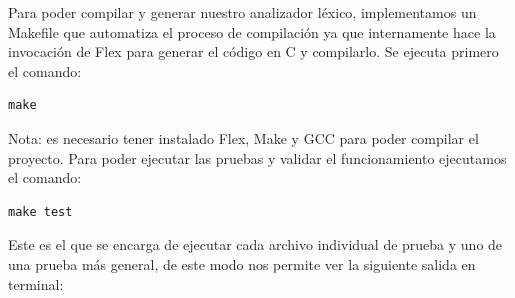 \documentclass[12pt, letterpaper]{article}
\begin{document}
\noindent Para poder compilar y generar nuestro analizador léxico, implementamos un Makefile que automatiza el proceso de compilación ya que internamente hace la invocación de Flex para generar el código en C y compilarlo. Se ejecuta primero el comando:
\begin{lstlisting}[style=bashstyle]
make
\end{lstlisting}
Nota: es necesario tener instalado Flex, Make y GCC para poder compilar el proyecto.
Para poder ejecutar las pruebas y validar el funcionamiento ejecutamos el comando:
\begin{lstlisting}[style=bashstyle]
make test
\end{lstlisting}
Este es el que se encarga de ejecutar cada archivo individual de prueba y uno de una prueba más general, de este modo nos permite ver la siguiente salida en terminal:
\end{document}
